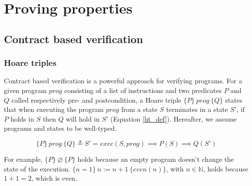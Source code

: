 \documentclass{kththesis}
\newcommand{\htriple}[3]{\ensuremath{\{#1\}~#2~\{#3\}}}
\begin{document}
\chapter{Proving properties}


\section{Contract based verification}

\subsection{Hoare triples}

Contract based verification is a powerful approach for verifying programs. For a given program $prog$ consisting of a list of instructions and two predicates $P$ and $Q$ called respectively pre- and postcondition, a Hoare triple \htriple{P}{prog}{Q} states that when executing the program $prog$ from a state $S$ terminates in a state $S'$, if $P$ holds in $S$ then $Q$ will hold in $S'$ (Equation \ref{ht_def}). Hereafter, we assume programs and states to be well-typed.

\begin{equation}
  \htriple{P}{prog}{Q} \triangleq S' = exec(S, prog) \implies P(S) \implies Q(S')
  \label{ht_def}
\end{equation}

For example, \htriple{P}{\varnothing}{P} holds because an empty program doesn't change the state of the execution. \htriple{n=1}{n:=n+1}{even(n)}, with $n \in \mathbb{N}$, holds because $1+1=2$, which is even.
\end{document}
